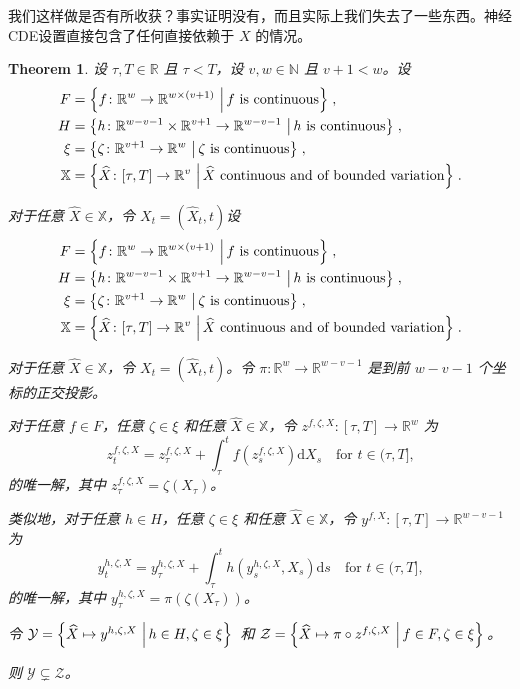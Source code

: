 \documentclass{ctexart}
\theoremstyle{plain}
\newtheorem{thm}{Theorem}[section]
\theoremstyle{definition}
\newcommand{\reals}{\mathbb{R}}
\newcommand{\naturals}{\mathbb{N}}
\newcommand{\set}[2]{\left\{{#1}\,\left\vert\,{#2}\vphantom{{#1}}\right\}\right.}
\begin{document}
 我们这样做是否有所收获？事实证明没有，而且实际上我们失去了一些东西。神经CDE设置直接包含了任何直接依赖于 $X$ 的情况。
\begin{thm}\label{cont-rnn-thm}
	设 $\tau, T \in \reals$ 且 $\tau < T$，设 $v, w \in \naturals$ 且 $v + 1 < w$。设
\begin{align*}
	F &= \set{f \colon \reals^w \to \reals^{w \times (v + 1)}}{f \text{ is continuous}},\\
	H &= \set{h \colon \reals^{w-v-1} \times \reals^{v + 1} \to \reals^{w-v-1}}{h \text{ is continuous}},\\
	\xi&= \set{\zeta \colon \reals^{v + 1} \to \reals^w}{\zeta \text{ is continuous}},\\
	\mathbb{X}&= \set{\widehat{X} \colon [\tau, T] \to \reals^v}{\widehat{X} \text{ continuous and of bounded variation}}.
\end{align*}
	
	对于任意 $\widehat{X} \in \mathbb{X}$，令 $X_t = (\widehat{X}_t, t)$设
\begin{align*}
	F &= \set{f \colon \reals^w \to \reals^{w \times (v + 1)}}{f \text{ is continuous}},\\
	H &= \set{h \colon \reals^{w-v-1} \times \reals^{v + 1} \to \reals^{w-v-1}}{h \text{ is continuous}},\\
	\xi&= \set{\zeta \colon \reals^{v + 1} \to \reals^w}{\zeta \text{ is continuous}},\\
	\mathbb{X}&= \set{\widehat{X} \colon [\tau, T] \to \reals^v}{\widehat{X} \text{ continuous and of bounded variation}}.
\end{align*}
	
对于任意 $\widehat{X} \in \mathbb{X}$，令 $X_t = (\widehat{X}_t, t)$。令 $\pi \colon \reals^w \to \reals^{w-v-1}$ 是到前 $w-v-1$ 个坐标的正交投影。
	
对于任意 $f \in F$，任意 $\zeta \in \xi$ 和任意 $\widehat{X} \in \mathbb{X}$，令 $z^{f, \zeta, X} \colon [\tau, T] \to \reals^w$ 为
\begin{equation*}
	z^{f, \zeta, X}_t = z^{f, \zeta, X}_\tau + \int_\tau^t f(z^{f, \zeta, X}_s) \mathrm{d} X_s\quad\text{for $t \in (\tau, T]$,}
\end{equation*}
的唯一解，其中 $z^{f, \zeta, X}_\tau = \zeta(X_\tau)$。
	
类似地，对于任意 $h \in H$，任意 $\zeta \in \xi$ 和任意 $\widehat{X} \in \mathbb{X}$，令 $y^{f, X} \colon [\tau, T] \to \reals^{w-v-1}$ 为
\begin{equation*}
	y^{h, \zeta, X}_t = y^{h, \zeta, X}_\tau + \int_\tau^t h(y^{h, \zeta, X}_s, X_s) \mathrm{d}s\quad\text{for $t \in (\tau, T]$,}
\end{equation*}
的唯一解，其中 $y^{h, \zeta, X}_\tau = \pi(\zeta(X_\tau))$。
	
令 $\mathcal{Y} = \set{\widehat{X} \mapsto y^{h, \zeta, X}}{h \in H, \zeta \in \xi}$ 和 $\mathcal{Z} = \set{\widehat{X} \mapsto \pi \circ z^{f, \zeta, X}}{f \in F, \zeta \in \xi}$。
	
则 $\mathcal{Y} \subsetneq \mathcal{Z}$。
\end{thm}
	
\end{document}
